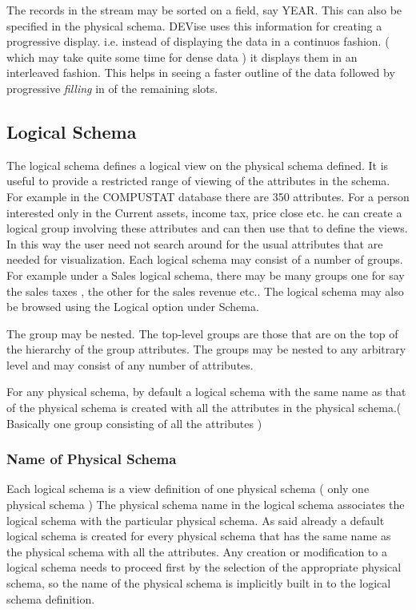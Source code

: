 The records in the stream may be sorted on a field, say YEAR. This can also be specified in the physical schema. DEVise uses this information for creating a progressive display. i.e. instead of displaying the data in a continuos fashion. ( which may take quite some time for dense data ) it displays them in an interleaved fashion. This helps in seeing a faster outline of the data followed by progressive {\em filling} in of the remaining slots.

\subsection{Logical Schema}

The logical schema defines a logical view on the physical schema defined. It is useful to provide a restricted range of viewing of the attributes in the schema. For example in the COMPUSTAT database there are 350 attributes. For a person interested only in the Current assets, income tax, price close etc. he can create a logical group involving these attributes and can then use that to define the views. In this way the user need not search around for the usual attributes that are needed for visualization. Each logical schema may consist of a number of groups. For example under a Sales logical schema, there may be many groups one for say the sales taxes , the other for the sales revenue etc.. The logical schema may also be browsed using the Logical option under Schema. 

The group may be nested. The top-level groups are those that are on the top of the hierarchy of the group attributes. The groups may be nested to any arbitrary level and may consist of any number of attributes.

For any physical schema, by default a logical schema with the same name as that of the physical schema is created with all the attributes in the physical schema.( Basically one group consisting of all the attributes ) 

\subsubsection{Name of Physical Schema}

Each logical schema is a view definition of one physical schema ( only one physical schema ) The physical schema name in the logical schema associates the logical schema with the particular physical schema. As said already a default logical schema is created for every physical schema that has the same name as the physical schema with all the attributes. Any creation or modification to a logical schema needs to proceed first by the selection of the appropriate physical schema, so the name of the physical schema is implicitly built in to the logical schema definition.

